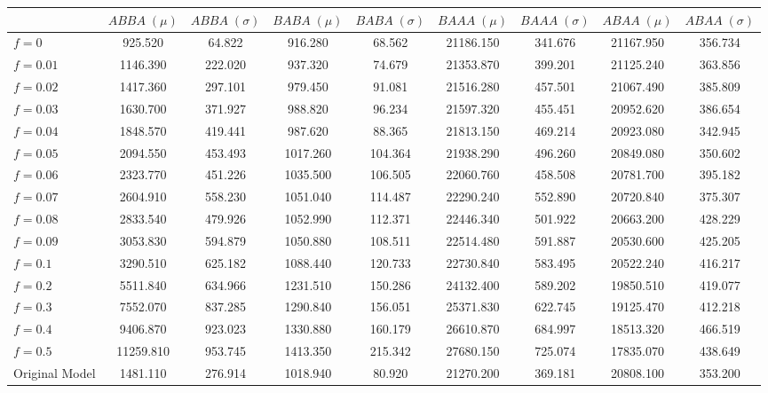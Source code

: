 \begin{tabular}{lcccccccc}
\toprule
 & $ABBA \;(\mu)$ & $ABBA \;(\sigma)$ & $BABA \;(\mu)$ & $BABA \;(\sigma)$ & $BAAA \;(\mu)$ & $BAAA \;(\sigma)$ & $ABAA \;(\mu)$ & $ABAA \;(\sigma)$ \\
\midrule
$f = 0$ & 925.520 & 64.822 & 916.280 & 68.562 & 21186.150 & 341.676 & 21167.950 & 356.734 \\
$f = 0.01$ & 1146.390 & 222.020 & 937.320 & 74.679 & 21353.870 & 399.201 & 21125.240 & 363.856 \\
$f = 0.02$ & 1417.360 & 297.101 & 979.450 & 91.081 & 21516.280 & 457.501 & 21067.490 & 385.809 \\
$f = 0.03$ & 1630.700 & 371.927 & 988.820 & 96.234 & 21597.320 & 455.451 & 20952.620 & 386.654 \\
$f = 0.04$ & 1848.570 & 419.441 & 987.620 & 88.365 & 21813.150 & 469.214 & 20923.080 & 342.945 \\
$f = 0.05$ & 2094.550 & 453.493 & 1017.260 & 104.364 & 21938.290 & 496.260 & 20849.080 & 350.602 \\
$f = 0.06$ & 2323.770 & 451.226 & 1035.500 & 106.505 & 22060.760 & 458.508 & 20781.700 & 395.182 \\
$f = 0.07$ & 2604.910 & 558.230 & 1051.040 & 114.487 & 22290.240 & 552.890 & 20720.840 & 375.307 \\
$f = 0.08$ & 2833.540 & 479.926 & 1052.990 & 112.371 & 22446.340 & 501.922 & 20663.200 & 428.229 \\
$f = 0.09$ & 3053.830 & 594.879 & 1050.880 & 108.511 & 22514.480 & 591.887 & 20530.600 & 425.205 \\
$f = 0.1$ & 3290.510 & 625.182 & 1088.440 & 120.733 & 22730.840 & 583.495 & 20522.240 & 416.217 \\
$f = 0.2$ & 5511.840 & 634.966 & 1231.510 & 150.286 & 24132.400 & 589.202 & 19850.510 & 419.077 \\
$f = 0.3$ & 7552.070 & 837.285 & 1290.840 & 156.051 & 25371.830 & 622.745 & 19125.470 & 412.218 \\
$f = 0.4$ & 9406.870 & 923.023 & 1330.880 & 160.179 & 26610.870 & 684.997 & 18513.320 & 466.519 \\
$f = 0.5$ & 11259.810 & 953.745 & 1413.350 & 215.342 & 27680.150 & 725.074 & 17835.070 & 438.649 \\
Original Model & 1481.110 & 276.914 & 1018.940 & 80.920 & 21270.200 & 369.181 & 20808.100 & 353.200 \\
\bottomrule
\end{tabular}
